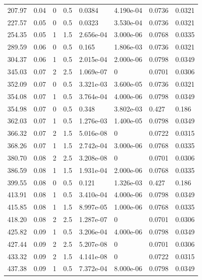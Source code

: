 \documentclass[preview]{standalone}
\begin{document}
{{\begin{tabular}{L{1.2cm}C{1.2cm} C{0.3cm}C{0.5cm} C{1.4cm}C{1.4cm} C{1.4cm}C{1.4cm}}
  207.97  &  0.04  & 0     & 0.5 &  0.0384  & 4.190e-04  & 0.0736 &  0.0321   \\ 
  227.57  &  0.05  & 0     & 0.5 &  0.0323  & 3.530e-04  & 0.0736 &  0.0321   \\ 
  254.35  &  0.05  & 1     & 1.5 &  2.656e-04  & 3.000e-06  & 0.0768 &  0.0335   \\ 
  289.59  &  0.06  & 0     & 0.5 &  0.165  & 1.806e-03  & 0.0736 &  0.0321   \\ 
  304.37  &  0.06  & 1     & 0.5 &  2.015e-04  & 2.000e-06  & 0.0798 &  0.0349   \\ 
  345.03  &  0.07  & 2     & 2.5 &  1.069e-07  & 0  & 0.0701 &  0.0306   \\ 
  352.09  &  0.07  & 0     & 0.5 &  3.321e-03  & 3.600e-05  & 0.0736 &  0.0321   \\ 
  354.08  &  0.07  & 1     & 0.5 &  3.764e-04  & 4.000e-06  & 0.0798 &  0.0349   \\ 
  354.98  &  0.07  & 0     & 0.5 &  0.348  & 3.802e-03  & 0.427 &  0.186   \\ 
  362.03  &  0.07  & 1     & 0.5 &  1.276e-03  & 1.400e-05  & 0.0798 &  0.0349   \\ 
  366.32  &  0.07  & 2     & 1.5 &  5.016e-08  & 0  & 0.0722 &  0.0315   \\ 
  368.26  &  0.07  & 1     & 1.5 &  2.742e-04  & 3.000e-06  & 0.0768 &  0.0335   \\ 
  380.70  &  0.08  & 2     & 2.5 &  3.208e-08  & 0  & 0.0701 &  0.0306   \\ 
  386.59  &  0.08  & 1     & 1.5 &  1.931e-04  & 2.000e-06  & 0.0768 &  0.0335   \\ 
  399.55  &  0.08  & 0     & 0.5 &  0.121  & 1.326e-03  & 0.427 &  0.186   \\ 
  413.91  &  0.08  & 1     & 0.5 &  3.410e-04  & 4.000e-06  & 0.0798 &  0.0349   \\ 
  415.85  &  0.08  & 1     & 1.5 &  8.997e-05  & 1.000e-06  & 0.0768 &  0.0335   \\ 
  418.20  &  0.08  & 2     & 2.5 &  1.287e-07  & 0  & 0.0701 &  0.0306   \\ 
  425.82  &  0.09  & 1     & 0.5 &  3.206e-04  & 4.000e-06  & 0.0798 &  0.0349   \\ 
  427.44  &  0.09  & 2     & 2.5 &  5.207e-08  & 0  & 0.0701 &  0.0306   \\ 
  433.32  &  0.09  & 2     & 1.5 &  4.141e-08  & 0  & 0.0722 &  0.0315   \\ 
  437.38  &  0.09  & 1     & 0.5 &  7.372e-04  & 8.000e-06  & 0.0798 &  0.0349   \\ 

\end{tabular}}}
\end{document}
